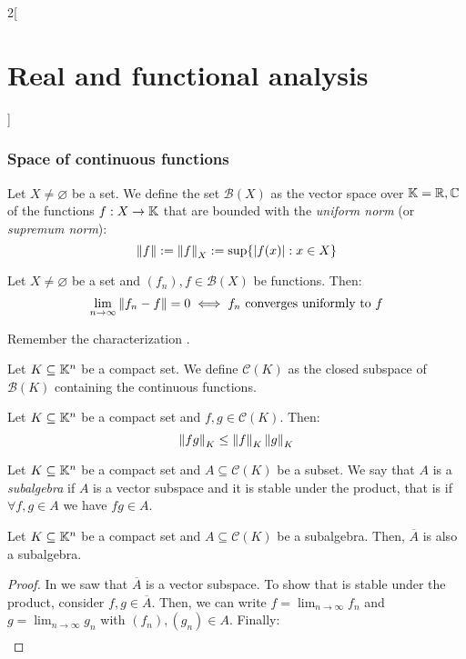 \documentclass[../../../main_math.tex]{subfiles}
\begin{document}
\begin{multicols}{2}[\section{Real and functional analysis}]
  \subsubsection{Space of continuous functions}
  \begin{definition}
    Let $X\ne \varnothing$ be a set. We define the set $\mathcal{B}(X)$ as the vector space over $\mathbb{K}=\mathbb{R},\mathbb{C}$ of the functions $f:X\rightarrow\mathbb{K}$ that are bounded with the \emph{uniform norm} (or \emph{supremum norm}): $$\left\|f\right\|:=\left\|f\right\|_X:=\sup\{\abs{f(x)}:x\in X\}$$
  \end{definition}
  \begin{proposition}
    Let $X\ne \varnothing$ be a set and $(f_n),f\in\mathcal{B}(X)$ be functions. Then: $$\lim_{n\to\infty}\left\|f_n-f\right\|=0\iff f_n\text{ converges uniformly to }f$$
  \end{proposition}
  \begin{sproof}
    Remember the characterization .
  \end{sproof}
  \begin{definition}
    Let $K\subseteq \mathbb{K}^n$ be a compact set. We define $\mathcal{C}(K)$ as the closed subspace of $\mathcal{B}(K)$ containing the continuous functions.
  \end{definition}
  \begin{proposition}
    Let $K\subseteq \mathbb{K}^n$ be a compact set and $f,g\in\mathcal{C}(K)$. Then: $$\left\|fg\right\|_K\leq\left\|f\right\|_K\left\|g\right\|_K$$
  \end{proposition}
  \begin{definition}
    Let $K\subseteq \mathbb{K}^n$ be a compact set and $A\subseteq \mathcal{C}(K)$ be a subset. We say that $A$ is a \emph{subalgebra} if $A$ is a vector subspace and it is stable under the product, that is if $\forall f,g\in A$ we have $fg\in A$.
  \end{definition}
  \begin{proposition}
    Let $K\subseteq \mathbb{K}^n$ be a compact set and $A\subseteq \mathcal{C}(K)$ be a subalgebra. Then, $\overline{A}$ is also a subalgebra.
  \end{proposition}
  \begin{proof}
    In  we saw that $\overline{A}$ is a vector subspace. To show that is stable under the product, consider $f,g\in\overline{A}$. Then, we can write $\displaystyle f=\lim_{n\to\infty} f_n$ and $\displaystyle g=\lim_{n\to\infty} g_n$ with $(f_n), (g_n)\in A$. Finally:
    \begin{align*}

\end{align*}
\end{proof}
\end{multicols}
\end{document}
